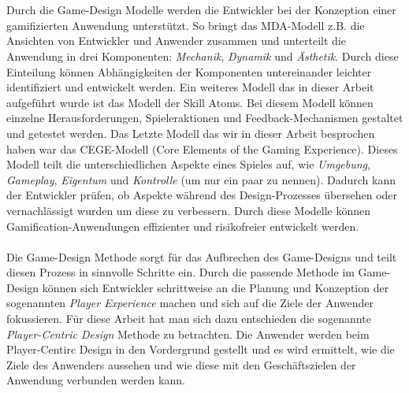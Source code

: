 \documentclass[a4paper,12pt,twoside]{scrartcl}
\begin{document}
\\\\  
Durch die Game-Design Modelle werden die Entwickler bei der Konzeption einer gamifizierten Anwendung unterstützt. So bringt das MDA-Modell z.B. die Ansichten von Entwickler und Anwender zusammen und unterteilt die Anwendung in drei Komponenten: \textit{Mechanik}, \textit{Dynamik} und \textit{Ästhetik}. Durch diese Einteilung können Abhängigkeiten der Komponenten untereinander leichter identifiziert und entwickelt werden. Ein weiteres Modell das in dieser Arbeit aufgeführt wurde ist das Modell der Skill Atoms. Bei diesem Modell können einzelne Herausforderungen, Spieleraktionen und Feedback-Mechanismen gestaltet und getestet werden. Das Letzte Modell das wir in dieser Arbeit besprochen haben war das CEGE-Modell (Core Elements of the Gaming Experience). Dieses Modell teilt die unterschiedlichen Aspekte eines Spieles auf, wie \textit{Umgebung}, \textit{Gameplay}, \textit{Eigentum} und \textit{Kontrolle} (um nur ein paar zu nennen). Dadurch kann der Entwickler prüfen, ob Aspekte während des Design-Prozesses übersehen oder vernachlässigt wurden um diese zu verbessern. Durch diese Modelle können Gamification-Anwendungen effizienter und risikofreier entwickelt werden.    
\\\\
Die Game-Design Methode sorgt für das Aufbrechen des Game-Designs und teilt diesen Prozess in sinnvolle Schritte ein. Durch die passende Methode im Game-Design können sich Entwickler schrittweise an die Planung und Konzeption der sogenannten \textit{Player Experience} machen und sich auf die Ziele der Anwender fokussieren. Für diese Arbeit hat man sich dazu entschieden die sogenannte \textit{Player-Centric Design} Methode zu betrachten. Die Anwender werden beim Player-Centirc Design in den Vordergrund gestellt und es wird ermittelt, wie die Ziele des Anwenders aussehen und wie diese mit den Geschäftszielen der Anwendung verbunden werden kann.    
\\\\
\end{document}
